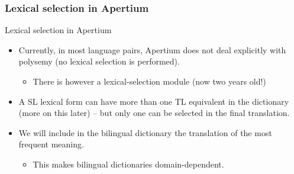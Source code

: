 \documentclass[10pt,xetex]{beamer} %
\begin{document}
\begin{frame}
  \frametitle{Lexical selection in Apertium}

	\begin{block}{Lexical selection in Apertium}
\begin{itemize}
\item    Currently, in most language pairs, Apertium does not deal explicitly with polysemy (no lexical selection is performed).
\begin{itemize}
  \item There is however a lexical-selection module (now two years old!)
\end{itemize}
\item    A SL lexical form can have more than one TL equivalent in the
    dictionary (more on this later) -- but only one can be selected in the final translation.
\item    We will include in the bilingual dictionary the translation of the
    most frequent meaning.
			\begin{itemize}
\item    This makes bilingual dictionaries domain-dependent.
			\end{itemize}
\end{itemize}
	\end{block}

\end{frame}
\end{document}
